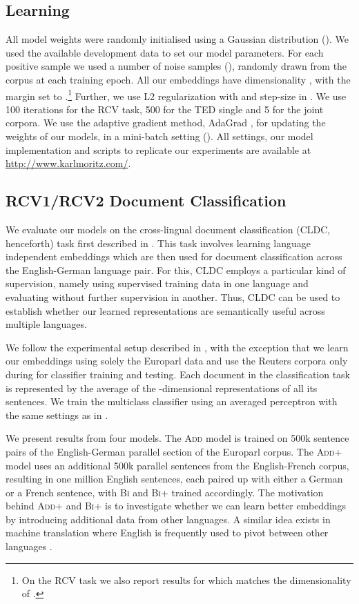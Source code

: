 \documentclass[11pt]{article}
\newcommand{\addMod}{\textsc{Add}\xspace}
\newcommand{\addModplus}{\textsc{Add+}\xspace}
\newcommand{\flatMod}{\textsc{Bi}\xspace}
\newcommand{\flatModplus}{\textsc{Bi+}\xspace}
\begin{document}
\subsection{Learning}

All model weights were randomly initialised using a Gaussian distribution
(). We used the available development data to set our
model parameters. For each positive sample we used a number of noise samples (), randomly drawn from the corpus at each training epoch.  All
our embeddings have dimensionality , with the margin set to
.\footnote{On the RCV task we also report results for  which
  matches the dimensionality of .} Further, we use L2
regularization with  and step-size in . We use 100
iterations for the RCV task, 500 for the TED single and 5 for the joint
corpora. We use the adaptive gradient method, AdaGrad \cite{Duchi:2011}, for
updating the weights of our models, in a mini-batch setting ().
All settings, our model implementation and scripts to replicate our
experiments are available at \mbox{\url{http://www.karlmoritz.com/}}.

\subsection{RCV1/RCV2 Document Classification}\label{sec:rcv-cldc}

We evaluate our models on the cross-lingual document classification (CLDC,
  henceforth) task first described in .  This task
involves learning language independent embeddings which are then used for
document classification across the English-German language pair.  For this, CLDC
employs a particular kind of supervision, namely using supervised training data
in one language and evaluating without further supervision in another.  Thus,
CLDC can be used to establish whether our learned representations are
semantically useful across multiple languages.

We follow the experimental setup described in , with
the exception that we learn our embeddings using solely the Europarl data and
use the Reuters corpora only during for classifier training and testing.  Each
document in the classification task is represented by the average of the
-dimensional representations of all its sentences.  We train the multiclass
classifier using an averaged perceptron \cite{Collins:2002} with the same
settings as in .

We present results from four models.  The \addMod model is trained on 500k
sentence pairs of the English-German parallel section of the Europarl corpus.
The \addModplus model uses an additional 500k parallel sentences from the
English-French corpus, resulting in one million English sentences, each paired
up with either a German or a French sentence, with \flatMod and \flatModplus
trained accordingly.
The motivation behind \addModplus and \flatModplus is to investigate whether we
can learn better embeddings by introducing additional data from other languages.
A similar idea exists in machine translation where English
is frequently used to pivot between other languages \cite{Cohn:2007}.
\end{document}
